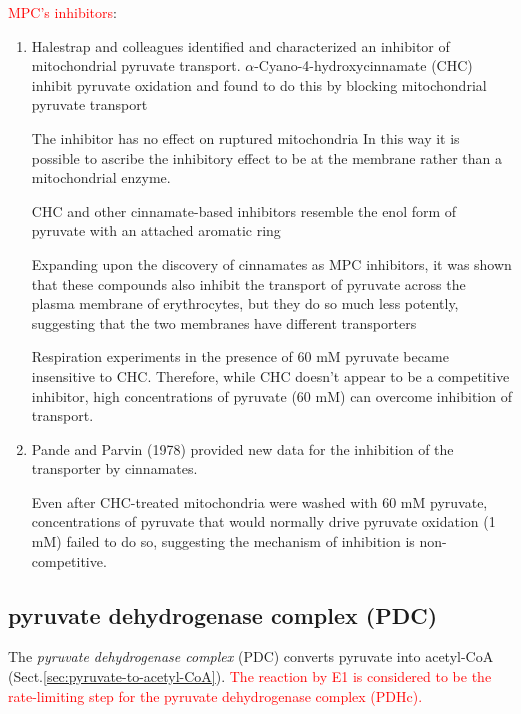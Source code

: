 \textcolor{red}{MPC's inhibitors}:
\begin{enumerate}
  \item  Halestrap and colleagues identified and characterized an inhibitor of
  mitochondrial pyruvate transport. $\alpha$-Cyano-4-hydroxycinnamate (CHC)
   inhibit pyruvate oxidation and found to do this by blocking mitochondrial
  pyruvate transport

The inhibitor has no effect on ruptured mitochondria
In this way it is possible to ascribe the inhibitory effect to be at the
membrane rather than a mitochondrial enzyme.

CHC and other cinnamate-based inhibitors resemble the enol form of pyruvate with
an attached aromatic ring

Expanding upon the discovery of cinnamates as MPC inhibitors, it was shown that
these compounds also inhibit the transport of pyruvate across the plasma
membrane of erythrocytes, but they do so much less potently, suggesting that the
two membranes have different transporters

Respiration experiments in the presence of 60 mM pyruvate became insensitive to
CHC. Therefore, while CHC doesn't appear to be a competitive inhibitor, high
concentrations of pyruvate (60 mM) can overcome inhibition of transport.

  \item Pande and Parvin (1978) provided new data for the inhibition of the
  transporter by cinnamates.

Even after CHC-treated mitochondria were washed with 60 mM pyruvate,
concentrations of pyruvate that would normally drive pyruvate oxidation (1 mM)
failed to do so, suggesting the mechanism of inhibition is non-competitive.


\end{enumerate}




\subsection{pyruvate dehydrogenase complex (PDC)}
\label{sec:pyruvate-dehydrogenase-complex}
\label{sec:prosthetic-group}

The {\it pyruvate dehydrogenase complex} (PDC) converts pyruvate into acetyl-CoA
(Sect.\ref{sec:pyruvate-to-acetyl-CoA}). \textcolor{red}{The reaction by E1 is
considered to be the rate-limiting step for the pyruvate dehydrogenase complex
(PDHc).}


